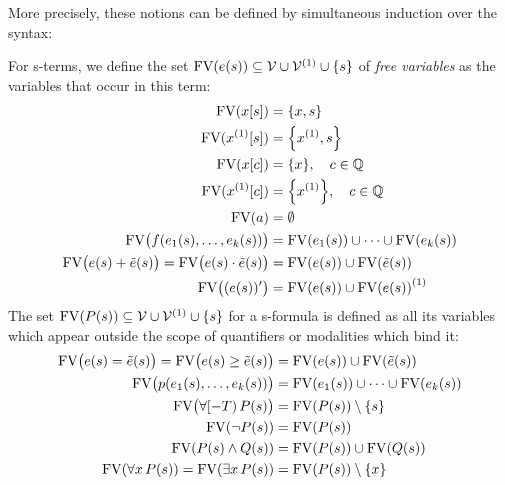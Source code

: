         More precisely, these notions can be defined by simultaneous induction over the syntax:
        \begin{definition}
            For s-terms, we define the set $\freevars{\astrm(s)}\subseteq\allvars\cup\diffvars\cup\set{s}$ of \emph{free variables} as the variables that occur in this term:
            \begin{align*}
                \freevars{\x[s]} &= \set{x,s}\\
                \freevars{\Dx[s]} &= \set{\D{x},s}\\
                \freevars{\x[c]} &= \set{x}, \quad c\in\Q\\
                \freevars{\Dx[c]} &= \set{\D{x}}, \quad c\in\Q\\
                \freevars{a} &= \emptyset\\
                \freevars[\big]{f(\range{\istrm{1}(s)}{\istrm{k}(s)})} &= \freevars{\istrm{1}(s)} \cup\cdots\cup \freevars{\istrm{k}(s)}\\
                \freevars[\big]{\astrm(s)+\bstrm(s)} = \freevars[\big]{\astrm(s)\cdot\bstrm(s)} &= \freevars{\astrm(s)}\cup\freevars{\bstrm(s)}\\
                \freevars[\big]{\der{\astrm(s)}} &= \freevars{\astrm(s)}\cup\D{\freevars{\astrm(s)}}
            \end{align*}
            The set $\freevars{\asfml(s)}\subseteq\allvars\cup\diffvars\cup\set{s}$ for a s-formula is defined as all its variables which appear outside the scope of quantifiers or modalities which bind it:
            \begin{align*}
                \freevars[\big]{\astrm(s)=\bstrm(s)} = \freevars[\big]{\astrm(s)\geq\bstrm(s)} &= \freevars{\astrm(s)}\cup\freevars{\bstrm(s)}\\
                \freevars[\big]{p(\range{\istrm{1}(s)}{\istrm{k}(s)})} &= \freevars{\istrm{1}(s)} \cup\cdots\cup \freevars{\istrm{k}(s)}\\
                \freevars[\big]{\hs{\asfml(s)}} &= \freevars{\asfml(s)}\setminus\set{s}\\
                \freevars{\lnot\asfml(s)} &= \freevars{\asfml(s)}\\
                \freevars{\asfml(s)\land\bsfml(s)} &= \freevars{\asfml(s)}\cup\freevars{\bsfml(s)}\\
                \freevars{\lforall{x}{\asfml(s)}} = \freevars{\lexists{x}{\asfml(s)}} &= \freevars{\asfml(s)}\setminus\set{x}\\

\end{align*}
\end{definition}
